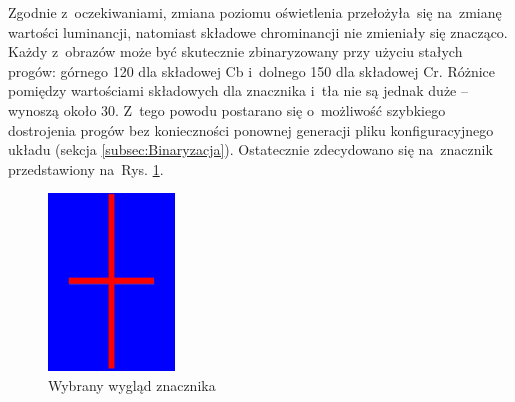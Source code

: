 Zgodnie z~oczekiwaniami, zmiana poziomu oświetlenia przełożyła~się na~zmianę wartości luminancji, natomiast składowe chrominancji nie zmieniały się znacząco. Każdy z~obrazów może być skutecznie zbinaryzowany przy użyciu stałych progów: górnego 120 dla składowej Cb i~dolnego 150 dla składowej Cr. Różnice pomiędzy wartościami składowych dla znacznika i~tła nie są jednak duże -- wynoszą około 30. Z~tego powodu postarano się o~możliwość szybkiego dostrojenia progów bez konieczności ponownej generacji pliku konfiguracyjnego układu (sekcja \ref{subsec:Binaryzacja}). Ostatecznie zdecydowano się na~znacznik przedstawiony na~Rys. \ref{fig:znacznik}.
\begin{figure}[h]
	\centering
	\includegraphics[width=0.3\textwidth]{znacznik.jpg}
	\caption{Wybrany wygląd znacznika}
	\label{fig:znacznik}
\end{figure}

\iffalse
